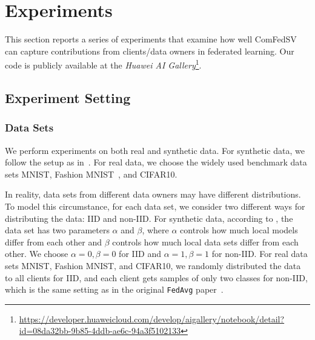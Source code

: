 \section{Experiments} \label{sec:7-7}
This section reports a series of experiments that examine how well ComFedSV can capture contributions from clients/data owners in federated learning. Our code is publicly available at the \emph{Huawei AI Gallery}\footnote{\url{https://developer.huaweicloud.com/develop/aigallery/notebook/detail?id=08da32bb-9b85-4ddb-ae6c-94a3f5102133}}.

\subsection{Experiment Setting} \label{sec:7-7-1}

\subsubsection{Data Sets} 
We perform experiments on both real and synthetic data. For synthetic data, we follow the setup as in~\citep{li2018federated}. For real data, we choose the widely used benchmark data sets MNIST, Fashion MNIST~\citep{xiao2017fashion}, and CIFAR10.  

In reality, data sets from different data owners may have different distributions. To model this circumstance, for each data set, we consider two different ways for distributing the data: IID and non-IID. For synthetic data, according to \cite{li2018federated}, the data set has two parameters $\alpha$ and $\beta$, where $\alpha$ controls how much local models differ from each other and $\beta$ controls how much local data sets differ from each other. We choose $\alpha=0, \beta=0$ for IID and $\alpha=1, \beta=1$ for non-IID. For real data sets MNIST, Fashion MNIST, and CIFAR10, we randomly distributed the data to all clients for IID, and each client gets samples of only two classes for non-IID, which is the same setting as in the original \texttt{FedAvg} paper~\citep{mcmahan2017communication}.


